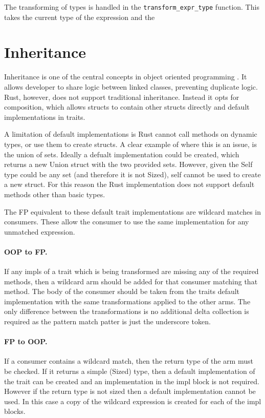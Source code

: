 \documentclass[ oneside,%
                    author={James Elgar},
                    degree={MEng},
                     title={Bidirectional transformer between functional and \\ object-oriented programming in Rust},
                  subtitle={}]{dissertation}
\begin{document}
The transforming of types is handled in the \verb|transform_expr_type| function. This takes the current type of the expression and the 


\section{Inheritance}
\label{sec:inheritance}

Inheritance is one of the central concepts in object oriented programming \cite{cook_palsberg_1989}. It allows developer to share logic between linked classes, preventing duplicate logic. Rust, however, does not support traditional inheritance. Instead it opts for composition, which allows structs to contain other structs directly and default implementations in traits.

A limitation of default implementations is Rust cannot call methods on dynamic types, or use them to create structs.
A clear example of where this is an issue, is the union of sets. Ideally a defualt implementation could be created, which returns a new Union struct with the two provided sets. However, given the Self type could be any set (and therefore it is not Sized), self cannot be used to create a new struct. For this reason the Rust implementation does not support default methods other than basic types.

The FP equivalent to these default trait implementations are wildcard matches in consumers. These allow the consumer to use the same implementation for any unmatched expression.

\paragraph{OOP to FP.} If any impls of a trait which is being transformed are missing any of the required methods, then a wildcard arm should be added for that consumer matching that method. The body of the consumer should be taken from the traits default implementation with the same transformations applied to the other arms. The only difference between the transformations is no additional delta collection is required as the pattern match patter is just the underscore token. 

\paragraph{FP to OOP.} If a consumer contains a wildcard match, then the return type of the arm must be checked. If it returns a simple (Sized) type, then a default implementation of the trait can be created and an implementation in the impl block is not required. However if the return type is not sized then a default implementation cannot be used. In this case a copy of the wildcard expression is created for each of the impl blocks. 
\end{document}
